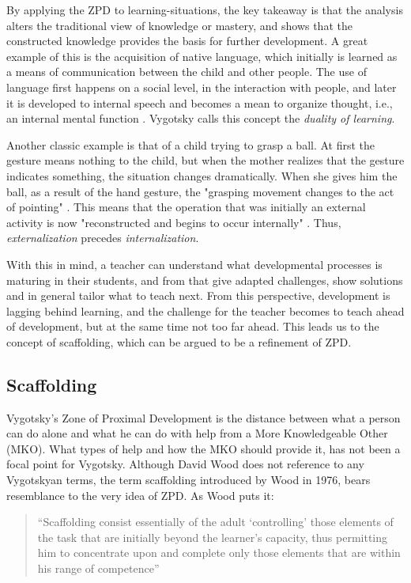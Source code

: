 By applying the ZPD to learning-situations, the key takeaway is that the analysis alters the traditional view of knowledge or mastery, and shows that the constructed knowledge provides the basis for further development. A great example of this is the acquisition of native language, which initially is learned as a means of communication between the child and other people. The use of language first happens on a social level, in the interaction with people, and later it is developed to internal speech and becomes a mean to organize thought, i.e., an internal mental function \citet[p. 89]{vygotskiui1978mind}. Vygotsky calls this concept the \textit{duality of learning}. 

Another classic example is that of a child trying to grasp a ball. At first the gesture means nothing to the child, but when the mother realizes that the gesture indicates something, the situation changes dramatically. When she gives him the ball, as a result of the hand gesture, the "grasping movement changes to the act of pointing" \citep{vygotskiui1978mind}. This means that the operation that was initially an external activity is now "reconstructed and begins to occur internally" \citep{vygotskiui1978mind}. Thus, \textit{externalization} precedes \textit{internalization}. 

With this in mind, a teacher can understand what developmental processes is maturing in their students, and from that give adapted challenges, show solutions and in general tailor what to teach next. From this perspective, development is lagging behind learning, and the challenge for the teacher becomes to teach ahead of development, but at the same time not too far ahead. This leads us to the concept of scaffolding, which can be argued to be a refinement of ZPD.

\subsection{Scaffolding}
Vygotsky’s Zone of Proximal Development is the distance between what a person can do alone and what he can do with help from a More Knowledgeable Other (MKO). What types of help and how the MKO should provide it, has not been a focal point for Vygotsky. Although David Wood does not reference to any Vygotskyan terms, the term scaffolding introduced by Wood in 1976, bears resemblance to the very idea of ZPD. As Wood puts it:

\begin{quote}“Scaffolding consist essentially of the adult ‘controlling’ those elements of the task that are initially beyond the learner’s capacity, thus permitting him to concentrate upon and complete only those elements that are within his range of competence” \citep{wood1976role}
\end{quote}

